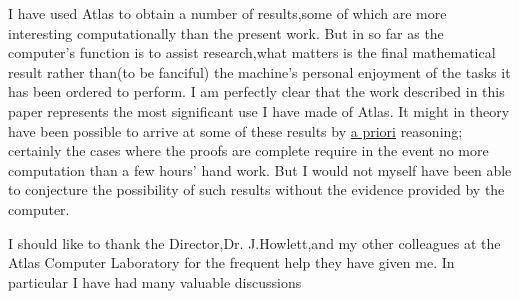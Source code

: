 I have used Atlas to obtain a number of results,some of which are more interesting computationally than the present work. But in so far as the computer's function is to assist research,what matters is the final mathematical result rather than(to be fanciful) the machine's personal enjoyment of the tasks it has been ordered to perform. I am perfectly clear that the work described in this paper represents the most significant use I have made of Atlas. It might in theory have been possible to arrive at some of these results by \uline{a priori} reasoning; certainly the cases where the proofs are complete require in the event no more computation than a few hours' hand work. But I would not myself have been able to conjecture the possibility of such results without the evidence provided by the computer.

I should like to thank the Director,Dr. J.Howlett,and my other colleagues at the Atlas Computer Laboratory for the frequent help they have given me. In particular I have had many valuable discussions

